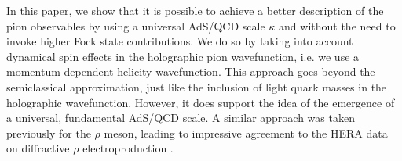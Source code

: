 \documentclass{PoS}
\begin{document}
In this paper, we show that it is possible to achieve a better description of the pion observables by using a universal AdS/QCD scale $\kappa$ and without the need to invoke higher Fock state contributions. We do so by taking into account dynamical spin effects in the holographic pion wavefunction, i.e. we use a momentum-dependent helicity wavefunction.   This approach goes beyond the semiclassical approximation, just like the inclusion of light quark masses in the holographic wavefunction. However, it does support the idea of the emergence of a universal, fundamental AdS/QCD scale. A similar approach was taken previously for the $\rho$ meson, leading to impressive agreement to the HERA data on diffractive $\rho$ electroproduction \cite{Forshaw:2012im}.




\end{document}
